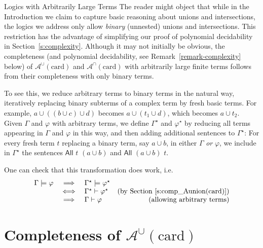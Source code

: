 \documentclass[letterpaper]{article} %
\theoremstyle{definition}
\newcommand{\proves}{\vdash}
\newcommand{\Aunion}{\mathscr{A}^{\cup}}
\newcommand{\Ainter}{\mathscr{A}^{\cap}}
\newcommand{\All}[2]{\mathsf{All}\,\,#1\,\,#2}
\newcommand{\card}{\mathrm{card}}
\begin{document}
\begin{subsection}{Logics with Arbitrarily Large Terms}
The reader might object that while in the Introduction we claim to capture basic reasoning about unions and intersections, the logics we address only allow \emph{binary} (unnested) unions and intersections. This restriction has the advantage of simplifying our proof of polynomial decidability in Section~\ref{s:complexity}. Although it may not initially be obvious, the completeness (and polynomial decidability, see Remark~\ref{remark-complexity} below) of $\Aunion(\card)$ and $\Ainter(\card)$ with arbitrarily large finite terms follows from their completeness with only binary terms.

To see this, we reduce arbitrary terms to binary terms in the natural way, iteratively replacing binary subterms of a complex term by fresh basic terms. For example, $a\cup ((b\cup c) \cup d)$ becomes $a\cup (t_1\cup d)$, which becomes $a\cup t_2$. 
Given $\Gamma$ and $\varphi$ with arbitrary terms, we define $\Gamma^\star$ and $\varphi^\star$ by reducing all terms appearing in $\Gamma$ and $\varphi$ in this way, and then adding additional sentences to $\Gamma^\star$: For every fresh term $t$ replacing a binary term, say $a \cup b$, in either $\Gamma$ \emph{or} $\varphi$, we include in $\Gamma^\star$ the sentences $\All{t}{(a \cup b)}$ and $\All{(a \cup b)}{t}$.  

One can check that this transformation does work, i.e.
\[\begin{array}{lclr}
     \Gamma \models \varphi & 
     \implies &
     \Gamma^\star \models \varphi^\star &\\
     
     & 
     \iff &
     \Gamma^\star \proves \varphi^\star &
     \textrm{(by Section~\ref{s:comp_Aunion(card)})}\\
     
     &
     \implies &
     \Gamma \proves \varphi & \textrm{(allowing arbitrary terms)}\\
     
\end{array}
\]

\label{subsection-arbitraryterms}
\end{subsection}





\section{Completeness of $\Aunion(\card)$}\label{s:comp_Aunion(card)}
\label{section3}
\end{document}
